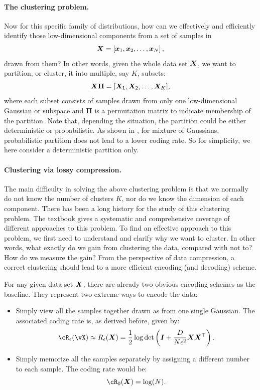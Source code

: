 \documentclass[../../book-main.tex]{subfiles}
\begin{document}
\paragraph{The clustering problem.}
Now for this specific family of distributions, how can we effectively and efficiently identify those low-dimensional components from a set of samples in
\begin{equation}
	\bm{X} = \left[\bm{x}_1, \bm{x}_2, \ldots, \bm{x}_N\right],
\end{equation}
drawn from them? In other words, given the whole data set $\bm{X}$, we want to partition, or cluster, it into multiple, say $K$, subsets:
\begin{equation}
	\bm{X}\bm \Pi = [\bm{X}_1, \bm{X}_2, \dots, \bm{X}_K],
\end{equation}
where each subset consists of samples drawn from only one low-dimensional Gaussian or subspace and $\bm \Pi$ is a permutation matrix to indicate membership of the partition. Note that, depending the situation, the partition could be either deterministic or probabilistic. As shown in \cite{ma2007segmentation}, for mixture of Gaussians, probabilistic partition does not lead to a lower coding rate. So for simplicity, we here consider a deterministic partition only.

\paragraph{Clustering via lossy compression.}
The main difficulty in solving the above clustering problem is that we normally do not know the number of clusters $K$, nor do we know the dimension of each component. There has been a long history for the study of this clustering problem. The textbook \cite{GPCA} gives a systematic and comprehensive coverage of different approaches to this problem. To find an effective approach to this problem, we first need to understand and clarify why we want to cluster. In other words, what exactly do we gain from clustering the data, compared with not to? How do we measure the gain? From the perspective of data compression, a correct clustering should lead to a more efficient encoding (and decoding) scheme.

For any given data set $\bm{X}$, there are already two obvious encoding schemes as the baseline. They represent two extreme ways to encode the data:
\begin{itemize}
	\item Simply view all the samples together drawn as from one single Gaussian. The associated coding rate is, as derived before, given by:
	      \begin{equation}
		      \cR_{\epsilon}(\vX) \approx R_{\epsilon}(\X) = \frac{1}{2} \log \det \left(\boldsymbol{I} + \frac{D}{N\epsilon^2} \X\X^\top \right).
	      \end{equation}
	\item Simply memorize all the samples separately by assigning a different number to each sample. The coding rate would be:
	      \begin{equation}
		      \cR_0(\X) = \log(N).
	      \end{equation}
\end{itemize}
\end{document}
